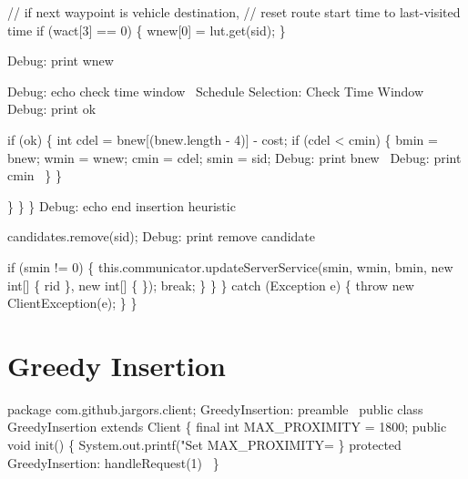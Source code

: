             // if next waypoint is vehicle destination,
            // reset route start time to last-visited time
            if (wact[3] == 0) \{
              wnew[0] = lut.get(sid);
            \}

            \LA{}Debug: print wnew~{\nwtagstyle{}}\RA{}

            \LA{}Debug: echo check time window~{\nwtagstyle{}}\RA{}
            \LA{}Schedule Selection: Check Time Window~{\nwtagstyle{}}\RA{}
            \LA{}Debug: print ok~{\nwtagstyle{}}\RA{}

            if (ok) \{
              int cdel = bnew[(bnew.length - 4)] - cost;
              if (cdel < cmin) \{
                bmin = bnew;
                wmin = wnew;
                cmin = cdel;
                smin = sid;
                \LA{}Debug: print bnew~{\nwtagstyle{}}\RA{}
                \LA{}Debug: print cmin~{\nwtagstyle{}}\RA{}
              \}
            \}

          \}
        \}
      \}
      \LA{}Debug: echo end insertion heuristic~{\nwtagstyle{}}\RA{}

      candidates.remove(sid);
      \LA{}Debug: print remove candidate~{\nwtagstyle{}}\RA{}

      if (smin != 0) \{
        this.communicator.updateServerService(smin, wmin, bmin,
            new int[] \{ rid \}, new int[] \{ \});
        break;
      \}
    \}
  \} catch (Exception e) \{
    throw new ClientException(e);
  \}
\}
\nwendcode{}\nwdocspar

\section{Greedy Insertion}

\nwenddocs{}\endmoddef\nwstartdeflinemarkup\nwenddeflinemarkup
package com.github.jargors.client;
\LA{}GreedyInsertion: preamble~{\nwtagstyle{}}\RA{}
public class GreedyInsertion extends Client \{
  final int MAX_PROXIMITY = 1800;
  public void init() \{
    System.out.printf("Set MAX_PROXIMITY=%
  \}
  protected \LA{}GreedyInsertion: handleRequest(1)~{\nwtagstyle{}}\RA{}
\}
\nwendcode{}\nwdocspar

